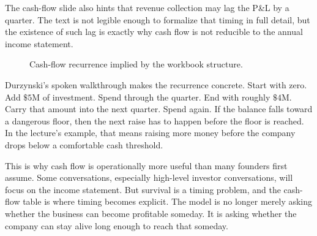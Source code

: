 The cash-flow slide also hints that revenue collection may lag the P\&L by a quarter. The text is not legible enough to formalize that timing in full detail, but the existence of such lag is exactly why cash flow is not reducible to the annual income statement.

\begin{figure}[t]
\centering
{}
\caption{Cash-flow recurrence implied by the workbook structure.}
\end{figure}

Durzynski's spoken walkthrough makes the recurrence concrete. Start with zero. Add \(\$5\text{M}\) of investment. Spend through the quarter. End with roughly \(\$4\text{M}\). Carry that amount into the next quarter. Spend again. If the balance falls toward a dangerous floor, then the next raise has to happen before the floor is reached. In the lecture's example, that means raising more money before the company drops below a comfortable cash threshold.

This is why cash flow is operationally more useful than many founders first assume. Some conversations, especially high-level investor conversations, will focus on the income statement. But survival is a timing problem, and the cash-flow table is where timing becomes explicit. The model is no longer merely asking whether the business can become profitable someday. It is asking whether the company can stay alive long enough to reach that someday.

